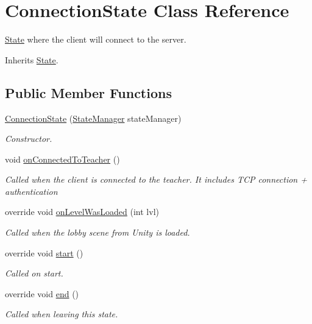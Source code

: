 \hypertarget{class_connection_state}{\section{Connection\-State Class Reference}
\label{class_connection_state}
}


\hyperlink{class_state}{State} where the client will connect to the server. 




Inherits \hyperlink{class_state}{State}.

\subsection*{Public Member Functions}
\begin{DoxyCompactItemize}
\item 
\hyperlink{class_connection_state_a4f95634e3b0b45fde7526175e5b455e8}{Connection\-State} (\hyperlink{class_state_manager}{State\-Manager} state\-Manager)
\begin{DoxyCompactList}\small\item\em Constructor.\end{DoxyCompactList}\item 
void \hyperlink{class_connection_state_a88fab17e1d21ee2defb1b1821a461b5d}{on\-Connected\-To\-Teacher} ()
\begin{DoxyCompactList}\small\item\em Called when the client is connected to the teacher. It includes T\-C\-P connection + authentication\end{DoxyCompactList}\item 
override void \hyperlink{class_connection_state_a3c29bedcc621b52075b9e7ee29f27816}{on\-Level\-Was\-Loaded} (int lvl)
\begin{DoxyCompactList}\small\item\em Called when the lobby scene from Unity is loaded.\end{DoxyCompactList}\item 
override void \hyperlink{class_connection_state_a4ea67162393d9c6ef29aca7807bc9035}{start} ()
\begin{DoxyCompactList}\small\item\em Called on start.\end{DoxyCompactList}\item 
override void \hyperlink{class_connection_state_a684dee54c5a99baecc475eba5417e21b}{end} ()
\begin{DoxyCompactList}\small\item\em Called when leaving this state.\end{DoxyCompactList}\item 

\end{DoxyCompactItemize}
